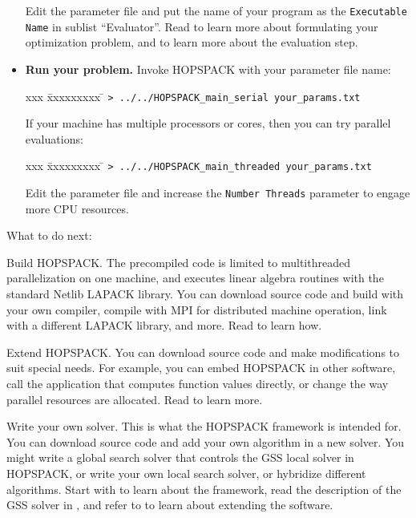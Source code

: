 \begin{itemize}
         Edit the parameter file and put the name of your program
         as the {\tt Executable Name} in sublist ``Evaluator''.
         Read  to learn more about formulating
         your optimization problem, and  to learn more
         about the evaluation step.
  \item  {\bf Run your problem.}
         Invoke HOPSPACK with your parameter file name:
         \vspace{-11pt}
         \begin{tabbing}
         xxx \= xxxxxxxxx \= \kill
         \> {\tt > ../../HOPSPACK\_main\_serial your\_params.txt}
         \end{tabbing}
         If your machine has multiple processors or cores, then you can
         try parallel evaluations:
         \vspace{-11pt}
         \begin{tabbing}
         xxx \= xxxxxxxxx \= \kill
         \> {\tt > ../../HOPSPACK\_main\_threaded your\_params.txt}
         \end{tabbing}
         Edit the parameter file and increase the {\tt Number Threads}
         parameter to engage more CPU resources.
\end{itemize}

\medskip
\noindent
What to do next:
\begin{INDENTdescription}
  \item[Build HOPSPACK.]
    The precompiled code is limited to multithreaded parallelization on one
    machine, and executes linear algebra routines with the standard Netlib
    LAPACK library.
    You can download source code and build with your own compiler,
    compile with MPI for distributed machine operation, link with a different
    LAPACK library, and more.
    Read  to learn how.
  \item[Extend HOPSPACK.]
    You can download source code and make modifications to suit special needs.
    For example, you can embed HOPSPACK in other software, call the application
    that computes function values directly, or change the way parallel
    resources are allocated.
    Read  to learn more.
  \item[Write your own solver.]
    This is what the HOPSPACK framework is intended for.  You can download
    source code and add your own algorithm in a new solver.  You might write
    a global search solver that controls the GSS local solver in HOPSPACK,
    or write your own local search solver, or hybridize different algorithms.
    Start with  to learn about the framework,
    read the description of the GSS solver in ,
    and refer to  to learn about extending the software.
\end{INDENTdescription}
